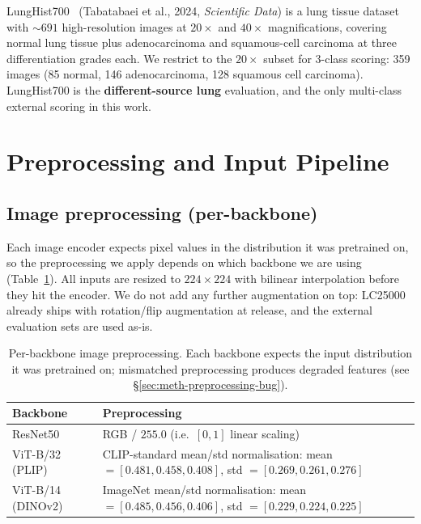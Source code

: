 LungHist700~\cite{tabatabaei2024lunghist} (Tabatabaei et al., 2024, \emph{Scientific Data}) is a lung tissue dataset with $\sim 691$ high-resolution images at $20\times$ and $40\times$ magnifications, covering normal lung tissue plus adenocarcinoma and squamous-cell carcinoma at three differentiation grades each. We restrict to the $20\times$ subset for 3-class scoring: 359 images (85 normal, 146 adenocarcinoma, 128 squamous cell carcinoma). LungHist700 is the \textbf{different-source lung} evaluation, and the only multi-class external scoring in this work.


\section{Preprocessing and Input Pipeline}
\label{sec:meth-pre}

\subsection{Image preprocessing (per-backbone)}

Each image encoder expects pixel values in the distribution it was pretrained on, so the preprocessing we apply depends on which backbone we are using (Table~\ref{tab:image-preprocessing}). All inputs are resized to $224 \times 224$ with bilinear interpolation before they hit the encoder. We do not add any further augmentation on top: LC25000 already ships with rotation/flip augmentation at release, and the external evaluation sets are used as-is.

\begin{table}[H]
    \centering
    \small
    \begin{tabular}{|l|p{}|}
    \hline
    \textbf{Backbone} & \textbf{Preprocessing} \\ \hline
    ResNet50            & RGB / $255.0$ (i.e.\ $[0, 1]$ linear scaling) \\ \hline
    ViT-B/32 (PLIP)     & CLIP-standard mean/std normalisation: mean $=[0.481, 0.458, 0.408]$, std $=[0.269, 0.261, 0.276]$ \\ \hline
    ViT-B/14 (DINOv2)   & ImageNet mean/std normalisation: mean $=[0.485, 0.456, 0.406]$, std $=[0.229, 0.224, 0.225]$ \\ \hline
    \end{tabular}
    \caption{Per-backbone image preprocessing. Each backbone expects the input distribution it was pretrained on; mismatched preprocessing produces degraded features (see §\ref{sec:meth-preprocessing-bug}).}
    \label{tab:image-preprocessing}
\end{table}

